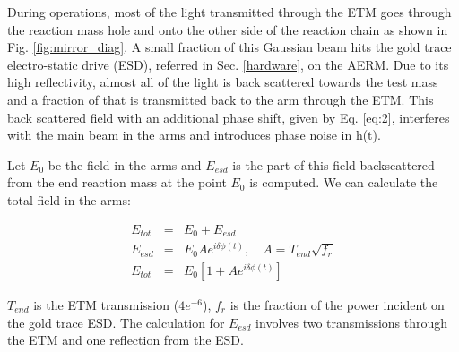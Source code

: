 \documentclass[12pt]{iopart}
\begin{document}
\par

During operations, most of the light transmitted through the ETM goes through the reaction mass hole and onto the other side of the reaction chain as shown in Fig. \ref{fig:mirror_diag}. A small fraction of this Gaussian beam hits the gold trace electro-static drive (ESD), referred in Sec. \ref{hardware}, on the AERM. Due to its high reflectivity, almost all of the light is back scattered towards the test mass and a fraction of that is transmitted back to the arm through the ETM. This back scattered field with an additional phase shift, given by Eq. \ref{eq:2}, interferes with the main beam in the arms and introduces phase noise in h(t).
\par
Let $E_{0}$ be the field in the arms and $E_{esd}$ is the part of this field backscattered from the end reaction mass at the point $E_{0}$ is computed. We can calculate the total field in the arms:

\begin{eqnarray}
    E_{tot} & = & E_{0} + E_{esd} \label{eq:4} \\
    E_{esd} & = & E_{0}Ae^{i{\delta}{\phi}(t)} ,\quad A = T_{end}\sqrt{f_{r}}  \label{eq:5} \\ 
    E_{tot} & = & E_{0}[1 + Ae^{i{\delta}{\phi}(t)}]  \label{eq:6}
\end{eqnarray}


   

$T_{end}$ is the ETM  transmission ($4e^{-6}$), $f_{r}$ is the fraction of the power incident on the gold trace ESD. The calculation for $E_{esd}$ involves two transmissions through the ETM and one reflection from the ESD.
\end{document}
